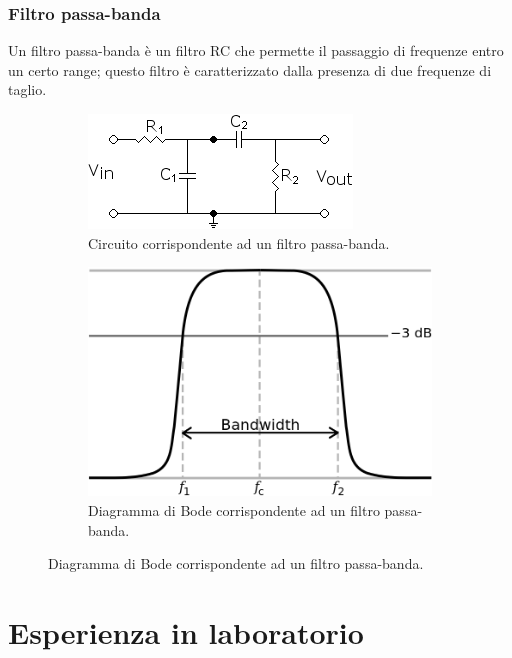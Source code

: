 \documentclass{article}
\begin{document}
			\subsubsection{Filtro passa-banda}
				Un filtro passa-banda è un filtro RC che permette il passaggio di frequenze entro un certo range; questo filtro è caratterizzato dalla presenza di due frequenze di taglio.
				\begin{figure}[h!]
					\centering
					\begin{subfigure}{0.4\textwidth}
						\centering
						\includegraphics[scale=0.6]{filtroPassaBanda}
						\caption{Circuito corrispondente ad un filtro passa-banda.}
					\end{subfigure}
					\begin{subfigure}{0.4\textwidth}
						\centering
						\includegraphics[scale=0.3]{filtroPassaBandaBode}
						\caption{Diagramma di Bode corrispondente ad un filtro passa-banda.}
					\end{subfigure}
					\label{fig:filtroPassaBanda}
				\end{figure}
	\section{Esperienza in laboratorio}
\end{document}
